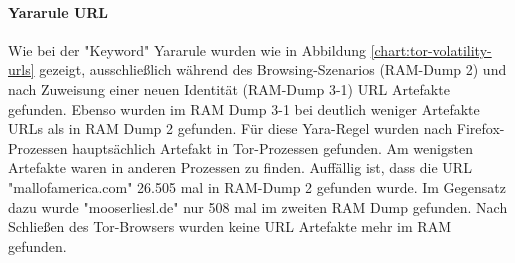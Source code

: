 \paragraph*{Yararule URL}
Wie bei der "Keyword" Yararule wurden wie in Abbildung \ref{chart:tor-volatility-urls} gezeigt, ausschließlich während des Browsing-Szenarios (RAM-Dump 2) und nach Zuweisung einer neuen Identität (RAM-Dump 3-1) URL Artefakte gefunden. Ebenso wurden im RAM Dump 3-1 bei deutlich weniger Artefakte URLs als in RAM Dump 2 gefunden. 
Für diese Yara-Regel wurden nach Firefox-Prozessen hauptsächlich Artefakt in Tor-Prozessen gefunden. Am wenigsten Artefakte waren in anderen Prozessen zu finden.
Auffällig ist, dass die URL "mallofamerica.com" 26.505 mal in RAM-Dump 2 gefunden wurde. Im Gegensatz dazu wurde "mooserliesl.de" nur 508 mal im zweiten RAM Dump  gefunden. Nach Schließen des Tor-Browsers wurden keine URL Artefakte mehr im RAM gefunden.
